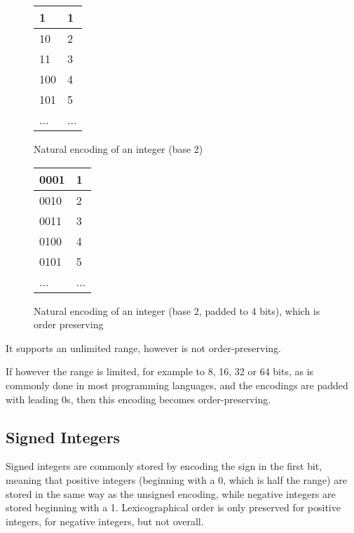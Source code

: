 \documentclass{acm_proc_article-sp}
\begin{document}
\begin{figure}
\caption{Natural encoding of an integer (base 2)}
\label{figure-natural-encoding}
\center
\begin{tabular}{|l|l|}
\hline
1 & 1 \\
\hline
10 & 2 \\
\hline
11 & 3 \\
\hline
100 & 4 \\
\hline
101 & 5 \\
\hline
... & ... \\
\hline
\end{tabular}
\end{figure}

\begin{figure}
\caption{Natural encoding of an integer (base 2, padded to 4 bits), which is order preserving}
\label{figure-natural-encoding-padded}
\center
\begin{tabular}{|l|l|}
\hline
0001 & 1 \\
\hline
0010 & 2 \\
\hline
0011 & 3 \\
\hline
0100 & 4 \\
\hline
0101 & 5 \\
\hline
... & ... \\
\hline
\end{tabular}
\end{figure}

It supports an unlimited range, however is not order-preserving.

If however the range is limited, for example to 8, 16, 32 or 64 bits, as is commonly done in most programming languages, and the encodings are padded with leading 0s, then this encoding becomes order-preserving.

\subsection{Signed Integers}

Signed integers are commonly stored by encoding the sign in the first bit, meaning that positive integers (beginning with a 0, which is half the range) are stored in the same way as the unsigned encoding, while negative integers are stored beginning with a 1. Lexicographical order is only preserved for positive integers, for negative integers, but not overall.
\end{document}
